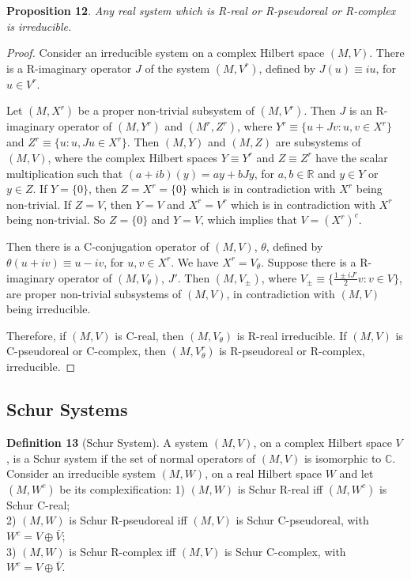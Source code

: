 \documentclass[11pt]{book}
\begin{document}
\textbf{Proposition 12}. \emph{Any real system which is R-real or
R-pseudoreal or R-complex is irreducible.}

\emph{Proof.} Consider an irreducible system on a complex Hilbert space
\((M,V)\). There is a R-imaginary operator \(J\) of the system
\((M ,V^{r})\), defined by \(J(u)\equiv i u\), for \(u\in V^r\).

Let \((M,X^r)\) be a proper non-trivial subsystem of \((M,V^{r})\). Then
\(J\) is an R-imaginary operator of \((M,Y^r)\) and \((M^r,Z^r)\), where
\(Y^r\equiv \{u+J v: u, v \in X^r\}\) and
\(Z^r\equiv \{u: u,Ju\in X^r\}\). Then \((M,Y)\) and \((M,Z)\) are
subsystems of \((M,V)\), where the complex Hilbert spaces
\(Y\equiv Y^r\) and \(Z\equiv Z^r\) have the scalar multiplication such
that \((a+ib)(y)=ay+bJy\), for \(a,b\in\mathbb{R}\) and \(y\in Y\) or
\(y\in Z\). If \(Y=\{0\}\), then \(Z=X^r=\{0\}\) which is in
contradiction with \(X^r\) being non-trivial. If \(Z=V\), then \(Y=V\)
and \(X^r=V^r\) which is in contradiction with \(X^r\) being
non-trivial. So \(Z=\{0\}\) and \(Y=V\), which implies that
\(V=(X^r)^c\).

Then there is a C-conjugation operator of \((M,V)\), \(\theta\), defined
by \(\theta(u+iv)\equiv u-iv\), for \(u,v\in X^r\). We have
\(X^r=V_\theta\). Suppose there is a R-imaginary operator of
\((M,V_\theta)\), \(J'\). Then \((M,V_{\pm})\), where
\(V_{\pm}\equiv\{\frac{1\pm iJ'}{2}v: v\in V\}\), are proper non-trivial
subsystems of \((M,V)\), in contradiction with \((M,V)\) being
irreducible.

Therefore, if \((M,V)\) is C-real, then \((M,V_\theta)\) is R-real
irreducible. If \((M,V)\) is C-pseudoreal or C-complex, then
\((M,V_\theta^r)\) is R-pseudoreal or R-complex, irreducible.~◻

\hypertarget{schur-systems}{%
\subsection{Schur Systems}\label{schur-systems}}

\textbf{Definition 13} (Schur System). A system \((M,V)\), on a complex
Hilbert space \(V\), is a Schur system if the set of normal operators of
\((M,V)\) is isomorphic to \(\mathbb{C}\).\\
Consider an irreducible system \((M,W)\), on a real Hilbert space \(W\)
and let \((M,W^c)\) be its complexification: 1) \((M,W)\) is Schur
R-real iff \((M,W^c)\) is Schur C-real;\\
2) \((M,W)\) is Schur R-pseudoreal iff \((M,V)\) is Schur C-pseudoreal,
with \(W^c=V\oplus \bar V\);\\
3) \((M,W)\) is Schur R-complex iff \((M,V)\) is Schur C-complex, with
\(W^c=V\oplus \bar V\).
\end{document}
